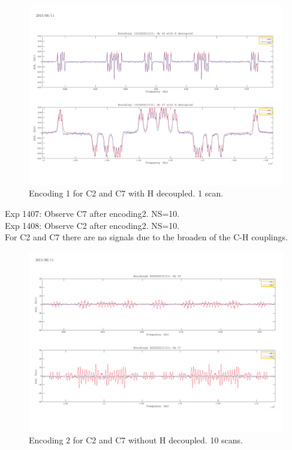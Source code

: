 \begin{figure}[htb]
\begin{center}
\includegraphics[width=\columnwidth]{Encoding1_with_decouple.pdf}
\end{center}
\setlength{\abovecaptionskip}{-0.35cm}
\caption{\footnotesize{Encoding 1 for C2 and C7 with H decoupled. 1 scan.}}\label{1405and1406}
\end{figure}

\clearpage
Exp 1407: Observe C7 after encoding2. NS=10.\\
Exp 1408: Observe C2 after encoding2. NS=10.\\

For C2 and C7 there are no signals due to the broaden of the C-H couplings.

\begin{figure}[htb]
\begin{center}
\includegraphics[width=\columnwidth]{Encoding2_without_decouple.pdf}
\end{center}
\setlength{\abovecaptionskip}{-0.35cm}
\caption{\footnotesize{Encoding 2 for C2 and C7 without H decoupled. 10 scans.}}\label{1407and1408}
\end{figure}

